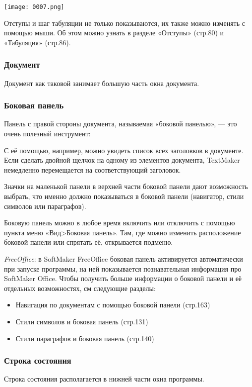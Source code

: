 \documentclass[a4paper,10pt]{article}
\begin{document}
\texttt{[image: 0007.png]}

Отступы и шаг табуляции не только показываются, их также можно изменять с помощью мыши. Об этом можно узнать в разделе «Отступы» (стр.80) и «Табуляция» (стр.86).

\subsubsection{Документ}
Документ как таковой занимает большую часть окна документа.

\subsubsection{Боковая панель}
Панель с правой стороны документа, называемая «боковой панелью», --- это очень полезный инструмент:

С её помощью, например, можно увидеть список всех заголовков в документе. Если сделать двойной щелчок на одному из элементов документа, TextMaker немедленно перемещается на соответствующий заголовок.

Значки на маленькой панели в верхней части боковой панели дают возможность выбрать, что именно должно показываться в боковой панели (навигатор, стили символов или параграфов).

Боковую панель можно в любое время включить или отключить с помощью пункта меню «Вид>Боковая панель». Там, где можно изменить расположение боковой панели или спрятать её, открывается подменю.

\textit{FreeOffice}: в SoftMaker FreeOffice боковая панель активируется автоматически при запуске программы, на ней показывается познавательная информация про SoftMaker Office.
Чтобы получить больше информации о боковой панели и её отдельных возможностях, см следующие разделы:
\begin{itemize}
 \item Навигация по документам с помощью боковой панели (стр.163)
 \item Стили символов и боковая панель (стр.131)
 \item Стили параграфов и боковая панель (стр.140)
\end{itemize}

\subsubsection{Строка состояния}
Строка состояния располагается в нижней части окна программы.
\end{document}
